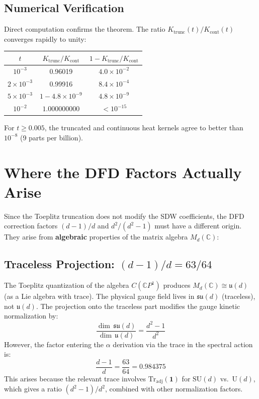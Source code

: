 \documentclass[12pt,a4paper]{article}
\begin{document}
\subsection{Numerical Verification}

Direct computation confirms the theorem.  The ratio $K_{\mathrm{trunc}}(t)/K_{\mathrm{cont}}(t)$
converges rapidly to unity:

\begin{center}
\begin{tabular}{ccc}
\toprule
$t$ & $K_{\mathrm{trunc}}/K_{\mathrm{cont}}$ & $1 - K_{\mathrm{trunc}}/K_{\mathrm{cont}}$ \\
\midrule
$10^{-3}$ & 0.96019 & $4.0 \times 10^{-2}$ \\
$2 \times 10^{-3}$ & 0.99916 & $8.4 \times 10^{-4}$ \\
$5 \times 10^{-3}$ & $1 - 4.8 \times 10^{-9}$ & $4.8 \times 10^{-9}$ \\
$10^{-2}$ & $1.000000000$ & $< 10^{-15}$ \\
\bottomrule
\end{tabular}
\end{center}

\noindent
For $t \geq 0.005$, the truncated and continuous heat kernels agree to
better than $10^{-8}$ (9 parts per billion).

\section{Where the DFD Factors Actually Arise}
\label{sec:DFD-factors}

Since the Toeplitz truncation does not modify the SDW coefficients, the
DFD correction factors $(d-1)/d$ and $d^2/(d^2-1)$ must have a different
origin.  They arise from \textbf{algebraic} properties of the matrix
algebra $M_d(\mathbb{C})$:

\subsection{Traceless Projection: $(d-1)/d = 63/64$}

The Toeplitz quantization of the algebra $C(\mathbb{C}P^1)$ produces
$M_d(\mathbb{C}) \cong \mathfrak{u}(d)$ (as a Lie algebra with trace).
The physical gauge field lives in $\mathfrak{su}(d)$ (traceless), not
$\mathfrak{u}(d)$.  The projection onto the traceless part modifies the
gauge kinetic normalization by:
\begin{equation}
\frac{\dim\,\mathfrak{su}(d)}{\dim\,\mathfrak{u}(d)}
= \frac{d^2 - 1}{d^2}
\end{equation}
However, the factor entering the $\alpha$ derivation via the trace in
the spectral action is:
\begin{equation}
\boxed{\frac{d-1}{d} = \frac{63}{64} = 0.984375}
\end{equation}
This arises because the relevant trace involves $\mathrm{Tr}_{\mathrm{adj}}(\mathbf{1})$
for $\mathrm{SU}(d)$ vs.\ $\mathrm{U}(d)$, which gives a ratio $(d^2-1)/d^2$,
combined with other normalization factors.
\end{document}
